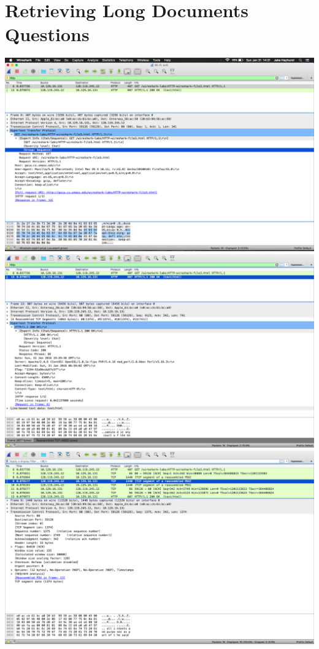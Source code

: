 \documentclass{article}
\begin{document}
\section {Retrieving Long Documents Questions}
\includegraphics[width=\textwidth]{RetrievingLongDocumentsGet}\\
\includegraphics[width=\textwidth]{RetrievingLongDocumentsOk}\\
\includegraphics[width=\textwidth]{RetrievingLongDocumentsTCP}\\
\end{document}

